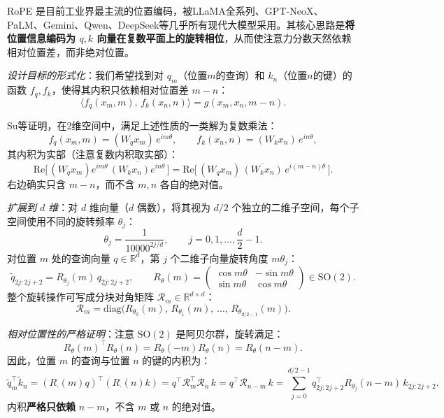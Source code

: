 \documentclass[12pt,a4paper]{article}
\begin{document}
RoPE 是目前工业界最主流的位置编码，被LLaMA全系列、GPT-NeoX、PaLM、Gemini、Qwen、DeepSeek等几乎所有现代大模型采用。其核心思路是\textbf{将位置信息编码为 $q, k$ 向量在复数平面上的旋转相位}，从而使注意力分数天然依赖相对位置差，而非绝对位置。

\textit{设计目标的形式化}：我们希望找到对 $q_m$（位置$m$的查询）和 $k_n$（位置$n$的键）的函数 $f_q, f_k$，使得其内积只依赖相对位置差 $m-n$：
\begin{equation}
\langle f_q(x_m, m),\, f_k(x_n, n) \rangle = g(x_m, x_n, m-n).
\end{equation}

Su等证明，在2维空间中，满足上述性质的一类解为复数乘法：
\begin{equation}
f_q(x_m, m) = (W_q x_m)\, e^{im\theta},\qquad f_k(x_n, n) = (W_k x_n)\, e^{in\theta},
\end{equation}
其内积为实部（注意复数内积取实部）：
\begin{equation}
\mathrm{Re}\bigl[\,(W_q x_m) e^{im\theta}\,\overline{(W_k x_n) e^{in\theta}}\,\bigr]
= \mathrm{Re}\bigl[\,(W_q x_m)\,\overline{(W_k x_n)}\, e^{i(m-n)\theta}\,\bigr].
\end{equation}
右边确实只含 $m-n$，而不含 $m, n$ 各自的绝对值。

\textit{扩展到 $d$ 维}：对 $d$ 维向量（$d$ 偶数），将其视为 $d/2$ 个独立的二维子空间，每个子空间使用不同的旋转频率 $\theta_j$：
\begin{equation}
\theta_j = \frac{1}{10000^{2j/d}}, \qquad j = 0, 1, \ldots, \frac{d}{2}-1.
\end{equation}
对位置 $m$ 处的查询向量 $q \in \mathbb{R}^d$，第 $j$ 个二维子向量旋转角度 $m\theta_j$：
\begin{equation}
\tilde{q}_{2j:2j+2} = R_{\theta_j}(m) \, q_{2j:2j+2}, \qquad
R_{\theta}(m) = \begin{pmatrix} \cos m\theta & -\sin m\theta \\ \sin m\theta & \cos m\theta \end{pmatrix} \in \mathrm{SO}(2).
\end{equation}
整个旋转操作可写成分块对角矩阵 $\mathcal{R}_m \in \mathbb{R}^{d \times d}$：
\begin{equation}
\mathcal{R}_m = \mathrm{diag}\!\bigl(R_{\theta_0}(m),\, R_{\theta_1}(m),\, \ldots,\, R_{\theta_{d/2-1}}(m)\bigr).
\end{equation}

\textit{相对位置性的严格证明}：注意 $\mathrm{SO}(2)$ 是阿贝尔群，旋转满足：
\begin{equation}
R_\theta(m)^\top R_\theta(n) = R_\theta(-m) R_\theta(n) = R_\theta(n-m).
\end{equation}
因此，位置 $m$ 的查询与位置 $n$ 的键的内积为：
\begin{equation}
\tilde{q}_m^\top \tilde{k}_n
= (R_{\cdot}(m) q)^\top (R_{\cdot}(n) k)
= q^\top \mathcal{R}_m^\top \mathcal{R}_n\, k
= q^\top \mathcal{R}_{n-m}\, k
= \sum_{j=0}^{d/2-1} q_{2j:2j+2}^\top R_{\theta_j}(n-m)\, k_{2j:2j+2}.
\end{equation}
内积\textbf{严格只依赖} $n-m$，不含 $m$ 或 $n$ 的绝对值。
\end{document}
